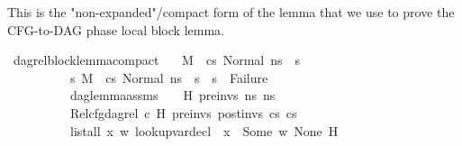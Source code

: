 \begin{isabellebody}
\begin{isamarkuptext}%
This is the "non-expanded"/compact form of the lemma that we use to prove the CFG-to-DAG phase
local block lemma.%
\end{isamarkuptext}\isamarkuptrue%
\isamarkupfalse%
\ dag{\isacharunderscore}{\kern0pt}rel{\isacharunderscore}{\kern0pt}block{\isacharunderscore}{\kern0pt}lemma{\isacharunderscore}{\kern0pt}compact{\isacharcolon}{\kern0pt}\isanewline
\ \ \ {\isachardoublequoteopen}M{\isacharcomma}{\kern0pt}{\isasymLambda}{\isacharcomma}{\kern0pt}{\isasymGamma}{\isacharcomma}{\kern0pt}{\isasymOmega}\ {\isasymturnstile}\ {\isasymlangle}cs{}{\isacharcomma}{\kern0pt}\ Normal\ ns{}{\isasymrangle}\ {\isacharbrackleft}{\kern0pt}{\isasymrightarrow}{\isacharbrackright}{\kern0pt}\ s{\isacharprime}{\kern0pt}{\isachardoublequoteclose}\ \isanewline
\ \ \ \ \ \ \ \ \ \ {\isachardoublequoteopen}{\isasymAnd}s{}{\isacharprime}{\kern0pt}{\isachardot}{\kern0pt}\ {\isacharparenleft}{\kern0pt}M{\isacharcomma}{\kern0pt}{\isasymLambda}{\isacharcomma}{\kern0pt}{\isasymGamma}{\isacharcomma}{\kern0pt}{\isasymOmega}\ {\isasymturnstile}\ {\isasymlangle}cs{}{\isacharcomma}{\kern0pt}\ Normal\ ns{}{\isasymrangle}\ {\isacharbrackleft}{\kern0pt}{\isasymrightarrow}{\isacharbrackright}{\kern0pt}\ s{}{\isacharprime}{\kern0pt}{\isacharparenright}{\kern0pt}\ {\isasymLongrightarrow}\ s{}{\isacharprime}{\kern0pt}\ {\isasymnoteq}\ Failure{\isachardoublequoteclose}\ \isanewline
\ \ \ \ \ \ \ \ \ \ {\isachardoublequoteopen}dag{\isacharunderscore}{\kern0pt}lemma{\isacharunderscore}{\kern0pt}assms\ {\isasymLambda}\ {\isasymGamma}\ {\isasymOmega}\ H\ pre{\isacharunderscore}{\kern0pt}invs\ ns{}\ ns{}{\isachardoublequoteclose}\ \isanewline
\ \ \ \ \ \ \ \ \ \ Rel{\isacharcolon}{\kern0pt}{\isachardoublequoteopen}cfg{\isacharunderscore}{\kern0pt}dag{\isacharunderscore}{\kern0pt}rel\ c\ H\ pre{\isacharunderscore}{\kern0pt}invs\ post{\isacharunderscore}{\kern0pt}invs\ cs{}\ cs{}{\isachardoublequoteclose}\ \isanewline
\ \ \ \ \ \ \ \ \ \ {\isachardoublequoteopen}list{\isacharunderscore}{\kern0pt}all\ {\isacharparenleft}{\kern0pt}{\isasymlambda}x{\isachardot}{\kern0pt}\ {\isasymexists}w{\isachardot}{\kern0pt}\ lookup{\isacharunderscore}{\kern0pt}var{\isacharunderscore}{\kern0pt}decl\ {\isasymLambda}\ x\ {\isacharequal}{\kern0pt}\ Some\ {\isacharparenleft}{\kern0pt}w{\isacharcomma}{\kern0pt}\ None{\isacharparenright}{\kern0pt}{\isacharparenright}{\kern0pt}\ H{\isachardoublequoteclose}\ \isanewline

\end{isabellebody}
